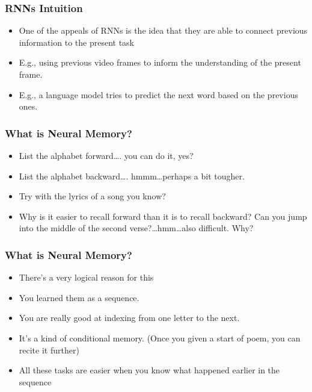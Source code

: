 \begin{frame}[fragile] \frametitle{RNNs Intuition}

\begin{itemize}
\item One of the appeals of RNNs is the idea that they are able to connect previous information to the present task
\item E.g., using previous video frames to inform the understanding of the present frame.
\item E.g., a language model tries to predict the next word based on the previous ones.
\end{itemize}
\end{frame}

\begin{frame}[fragile] \frametitle{What is Neural Memory?}

\begin{itemize}
\item List the alphabet forward\ldots. you can do it, yes?
\item List the alphabet backward\ldots. hmmm\ldots perhaps a bit tougher.
\item Try with the lyrics of a song you know?
\item Why is it easier to recall forward than it is to recall backward? Can you jump into the middle of the second verse?\ldots hmm\ldots also difficult. Why?
\end{itemize}
\end{frame}

\begin{frame}[fragile] \frametitle{What is Neural Memory?}

\begin{itemize}
\item There's a very logical reason for this
\item You learned them as a sequence. 
\item You are really good at indexing from one letter to the next.
\item It's a kind of conditional memory. (Once you given a start of poem, you can recite it further)
\item All these  tasks are easier when you know what happened earlier in the sequence
\end{itemize}
\end{frame}

